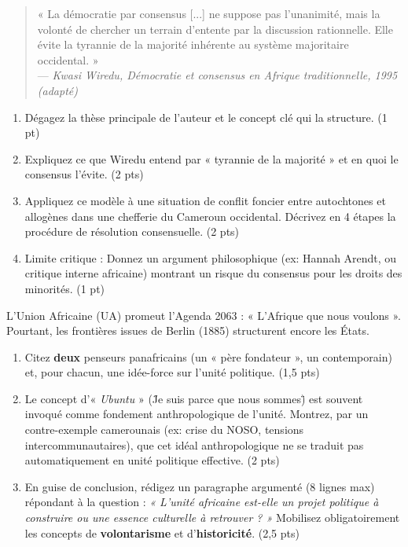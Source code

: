 \documentclass[11pt]{article}
\begin{document}
\begin{exercice}
\begin{quote}
« La démocratie par consensus [...] ne suppose pas l'unanimité, mais la volonté de chercher un terrain d'entente par la discussion rationnelle. Elle évite la tyrannie de la majorité inhérente au système majoritaire occidental. » \\
\hfill — \textit{Kwasi Wiredu, \textit{Démocratie et consensus en Afrique traditionnelle}, 1995 (adapté)}
\end{quote}

\begin{enumerate}
\item Dégagez la thèse principale de l'auteur et le concept clé qui la structure. \hfill (1 pt)
\item Expliquez ce que Wiredu entend par « tyrannie de la majorité » et en quoi le consensus l'évite. \hfill (2 pts)
\item Appliquez ce modèle à une situation de conflit foncier entre autochtones et allogènes dans une chefferie du Cameroun occidental. Décrivez en 4 étapes la procédure de résolution consensuelle. \hfill (2 pts)
\item Limite critique : Donnez un argument philosophique (ex: Hannah Arendt, ou critique interne africaine) montrant un risque du consensus pour les droits des minorités. \hfill (1 pt)
\end{enumerate}
\end{exercice}

\begin{exercice}
L'Union Africaine (UA) promeut l'Agenda 2063 : « L'Afrique que nous voulons ». Pourtant, les frontières issues de Berlin (1885) structurent encore les États.
\begin{enumerate}
\item Citez \textbf{deux} penseurs panafricains (un « père fondateur », un contemporain) et, pour chacun, une idée-force sur l'unité politique. \hfill (1,5 pts)
\item Le concept d'« \textit{Ubuntu} » (\"Je suis parce que nous sommes\") est souvent invoqué comme fondement anthropologique de l'unité. Montrez, par un contre-exemple camerounais (ex: crise du NOSO, tensions intercommunautaires), que cet idéal anthropologique ne se traduit pas automatiquement en unité politique effective. \hfill (2 pts)
\item En guise de conclusion, rédigez un paragraphe argumenté (8 lignes max) répondant à la question : \textit{« L'unité africaine est-elle un projet politique à construire ou une essence culturelle à retrouver ? »} Mobilisez obligatoirement les concepts de \textbf{volontarisme} et d'\textbf{historicité}. \hfill (2,5 pts)
\end{enumerate}
\end{exercice}
\end{document}
